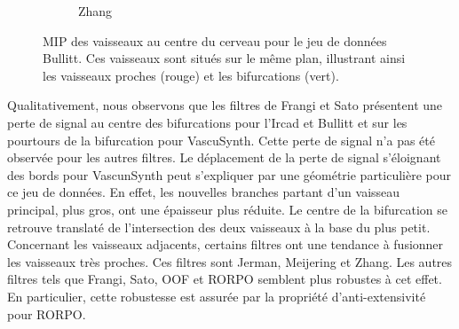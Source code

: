 \begin{figure}[!ht]
\begin{subfigure}[t]{0.32\textwidth}
          \caption{Zhang}
        \end{subfigure}
      
        \caption{
        MIP des vaisseaux au centre du cerveau pour le jeu de données Bullitt. Ces vaisseaux sont situés sur le même plan, illustrant ainsi les vaisseaux proches (rouge) et les bifurcations (vert).}
      \label{fig:bifurcation_Bullitt}
\end{figure}

Qualitativement, nous observons que les filtres de Frangi et Sato présentent une perte de signal au centre des bifurcations pour l'Ircad et Bullitt et sur les pourtours de la bifurcation pour VascuSynth. Cette perte de signal n'a pas été observée pour les autres filtres. Le déplacement de la perte de signal s'éloignant des bords pour VascunSynth peut s'expliquer par une géométrie particulière pour ce jeu de données. En effet, les nouvelles branches partant d'un vaisseau principal, plus gros, ont une épaisseur plus réduite. Le centre de la bifurcation se retrouve translaté de l'intersection des deux vaisseaux à la base du plus petit. Concernant les vaisseaux adjacents, certains filtres ont une tendance à fusionner les vaisseaux très proches. Ces filtres sont Jerman, Meijering et Zhang. Les autres filtres tels que Frangi, Sato, OOF et RORPO semblent plus robustes à cet effet. En particulier, cette robustesse est assurée par la propriété d'anti-extensivité pour RORPO.

